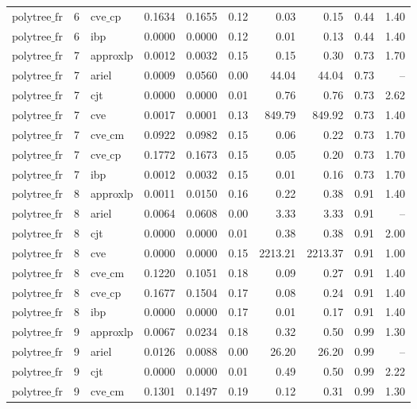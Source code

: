 \begin{table}[ht]
\begin{tabular}{lrlrrrrrrr}
$\text{polytree\_fr}$ & 6 & $\text{cve\_cp}$ & 0.1634 & 0.1655 & 0.12 & 0.03 & 0.15 & 0.44 & 1.40 \\
$\text{polytree\_fr}$ & 6 & ibp & 0.0000 & 0.0000 & 0.12 & 0.01 & 0.13 & 0.44 & 1.40 \\
$\text{polytree\_fr}$ & 7 & approxlp & 0.0012 & 0.0032 & 0.15 & 0.15 & 0.30 & 0.73 & 1.70 \\
$\text{polytree\_fr}$ & 7 & ariel & 0.0009 & 0.0560 & 0.00 & 44.04 & 44.04 & 0.73 & -- \\
$\text{polytree\_fr}$ & 7 & cjt & 0.0000 & 0.0000 & 0.01 & 0.76 & 0.76 & 0.73 & 2.62 \\
$\text{polytree\_fr}$ & 7 & cve & 0.0017 & 0.0001 & 0.13 & 849.79 & 849.92 & 0.73 & 1.40 \\
$\text{polytree\_fr}$ & 7 & $\text{cve\_cm}$ & 0.0922 & 0.0982 & 0.15 & 0.06 & 0.22 & 0.73 & 1.70 \\
$\text{polytree\_fr}$ & 7 & $\text{cve\_cp}$ & 0.1772 & 0.1673 & 0.15 & 0.05 & 0.20 & 0.73 & 1.70 \\
$\text{polytree\_fr}$ & 7 & ibp & 0.0012 & 0.0032 & 0.15 & 0.01 & 0.16 & 0.73 & 1.70 \\
$\text{polytree\_fr}$ & 8 & approxlp & 0.0011 & 0.0150 & 0.16 & 0.22 & 0.38 & 0.91 & 1.40 \\
$\text{polytree\_fr}$ & 8 & ariel & 0.0064 & 0.0608 & 0.00 & 3.33 & 3.33 & 0.91 & -- \\
$\text{polytree\_fr}$ & 8 & cjt & 0.0000 & 0.0000 & 0.01 & 0.38 & 0.38 & 0.91 & 2.00 \\
$\text{polytree\_fr}$ & 8 & cve & 0.0000 & 0.0000 & 0.15 & 2213.21 & 2213.37 & 0.91 & 1.00 \\
$\text{polytree\_fr}$ & 8 & $\text{cve\_cm}$ & 0.1220 & 0.1051 & 0.18 & 0.09 & 0.27 & 0.91 & 1.40 \\
$\text{polytree\_fr}$ & 8 & $\text{cve\_cp}$ & 0.1677 & 0.1504 & 0.17 & 0.08 & 0.24 & 0.91 & 1.40 \\
$\text{polytree\_fr}$ & 8 & ibp & 0.0000 & 0.0000 & 0.17 & 0.01 & 0.17 & 0.91 & 1.40 \\
$\text{polytree\_fr}$ & 9 & approxlp & 0.0067 & 0.0234 & 0.18 & 0.32 & 0.50 & 0.99 & 1.30 \\
$\text{polytree\_fr}$ & 9 & ariel & 0.0126 & 0.0088 & 0.00 & 26.20 & 26.20 & 0.99 & -- \\
$\text{polytree\_fr}$ & 9 & cjt & 0.0000 & 0.0000 & 0.01 & 0.49 & 0.50 & 0.99 & 2.22 \\
$\text{polytree\_fr}$ & 9 & $\text{cve\_cm}$ & 0.1301 & 0.1497 & 0.19 & 0.12 & 0.31 & 0.99 & 1.30 \\

\end{tabular}
\end{table}
